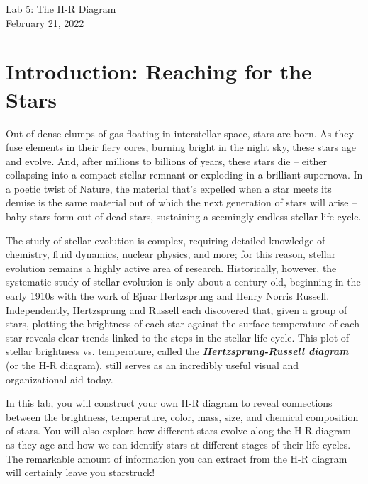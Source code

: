 \documentclass[11pt]{article}
\begin{document}
\begin{center}
\huge{Lab 5: The H-R Diagram}\\ \medskip \Large{February 21, 2022}
\end{center}

\section{Introduction: Reaching for the Stars}

Out of dense clumps of gas floating in interstellar space, stars are born. As they fuse elements in their fiery cores, burning bright in the night sky, these stars age and evolve. And, after millions to billions of years, these stars die -- either collapsing into a compact stellar remnant or exploding in a brilliant supernova. In a poetic twist of Nature, the material that's expelled when a star meets its demise is the same material out of which the next generation of stars will arise -- baby stars form out of dead stars, sustaining a seemingly endless stellar life cycle.  

\medskip \noindent
The study of stellar evolution is complex, requiring detailed knowledge of chemistry, fluid dynamics, nuclear physics, and more; for this reason, stellar evolution remains a highly active area of research. Historically, however, the systematic study of stellar evolution is only about a century old, beginning in the early 1910s with the work of Ejnar Hertzsprung and Henry Norris Russell. Independently, Hertzsprung and Russell each discovered that, given a group of stars, plotting the brightness of each star against the surface temperature of each star reveals clear trends linked to the steps in the stellar life cycle. This plot of stellar brightness vs. temperature, called the \textbf{\emph{Hertzsprung-Russell diagram}} (or the H-R diagram), still serves as an incredibly useful visual and organizational aid today.

\medskip \noindent
In this lab, you will construct your own H-R diagram to reveal connections between the brightness, temperature, color, mass, size, and chemical composition of stars. You will also explore how different stars evolve along the H-R diagram as they age and how we can identify stars at different stages of their life cycles. The remarkable amount of information you can extract from the H-R diagram will certainly leave you starstruck!
\end{document}

